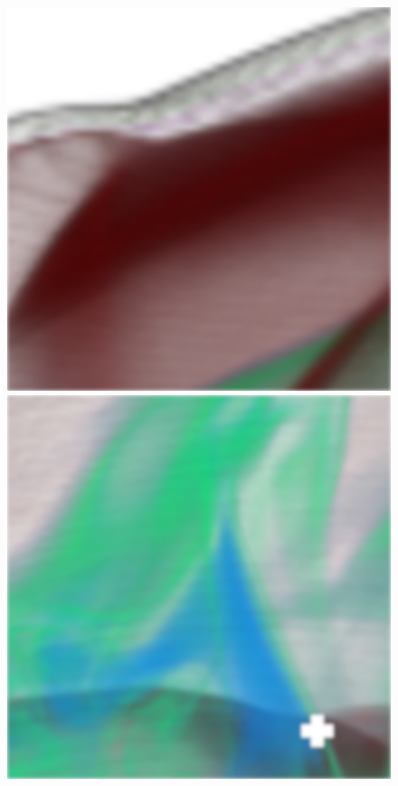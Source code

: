 \begin{figure}[]
	\centering
	\begin{minipage}[t]{0.3\textwidth}
		\centering
		\includegraphics[width=1\textwidth]{../../Neue_Messungen/Supernova/cut/mdc_ors/mdc_ors_1.png}
	\end{minipage}
	\hfill
	\begin{minipage}[t]{0.3\textwidth}
		\centering
		\includegraphics[width=1\textwidth]{../../Neue_Messungen/Supernova/cut/mdc_ors/mdc_ors_2.png}

\end{minipage}
\end{figure}
